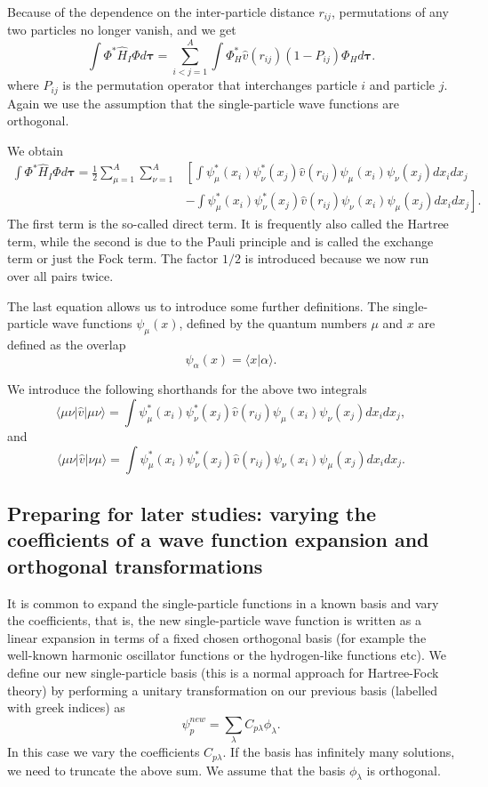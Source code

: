 Because of the dependence on the inter-particle distance $r_{ij}$,  permutations of
any two particles no longer vanish, and we get
\[
  \int \Phi^*\hat{H}_I\Phi d\mathbf{\tau} 
  = \sum_{i < j=1}^A \int  
  \Phi_H^*\hat{v}(r_{ij})(1-P_{ij})\Phi_H d\mathbf{\tau}.
\]
where $P_{ij}$ is the permutation operator that interchanges
particle $i$ and particle $j$. Again we use the assumption that the single-particle wave functions
are orthogonal. 

We obtain
\begin{align}
  \int \Phi^*\hat{H}_I\Phi d\mathbf{\tau} 
  = \frac{1}{2}\sum_{\mu=1}^A\sum_{\nu=1}^A
    &\left[ \int \psi_{\mu}^*(x_i)\psi_{\nu}^*(x_j)\hat{v}(r_{ij})\psi_{\mu}(x_i)\psi_{\nu}(x_j)
    dx_idx_j \right.\\
  &\left.
  - \int \psi_{\mu}^*(x_i)\psi_{\nu}^*(x_j)
  \hat{v}(r_{ij})\psi_{\nu}(x_i)\psi_{\mu}(x_j)
  dx_idx_j
  \right]. \label{H2Expectation}
\end{align}
The first term is the so-called direct term. It is frequently also called the  Hartree term, 
while the second is due to the Pauli principle and is called
the exchange term or just the Fock term.
The factor  $1/2$ is introduced because we now run over
all pairs twice. 

The last equation allows us to  introduce some further definitions.  
The single-particle wave functions $\psi_{\mu}(x)$, defined by the quantum numbers $\mu$ and $x$
are defined as the overlap 
\[
   \psi_{\alpha}(x)  = \langle x | \alpha \rangle .
\]

We introduce the following shorthands for the above two integrals
\[
\langle \mu\nu|\hat{v}|\mu\nu\rangle =  \int \psi_{\mu}^*(x_i)\psi_{\nu}^*(x_j)\hat{v}(r_{ij})\psi_{\mu}(x_i)\psi_{\nu}(x_j)
    dx_idx_j,
\]
and
\[
\langle \mu\nu|\hat{v}|\nu\mu\rangle = \int \psi_{\mu}^*(x_i)\psi_{\nu}^*(x_j)
  \hat{v}(r_{ij})\psi_{\nu}(x_i)\psi_{\mu}(x_j)
  dx_idx_j.  
\]

\subsection*{Preparing for later studies: varying the coefficients of a wave function expansion and orthogonal transformations}

It is common to  expand the single-particle functions in a known basis  and vary the coefficients, 
that is, the new single-particle wave function is written as a linear expansion
in terms of a fixed chosen orthogonal basis (for example the well-known harmonic oscillator functions or the hydrogen-like functions etc).
We define our new single-particle basis (this is a normal approach for Hartree-Fock theory) by performing a unitary transformation 
on our previous basis (labelled with greek indices) as
\begin{equation}
\psi_p^{new}  = \sum_{\lambda} C_{p\lambda}\phi_{\lambda}. \label{eq:newbasis}
\end{equation}
In this case we vary the coefficients $C_{p\lambda}$. If the basis has infinitely many solutions, we need
to truncate the above sum.  We assume that the basis $\phi_{\lambda}$ is orthogonal.

